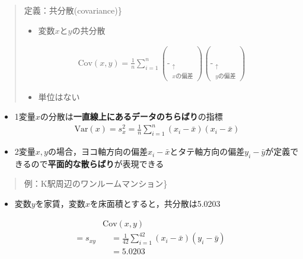 \documentclass[
]{book}
\providecommand{\tightlist}{%
  \setlength{\itemsep}{0pt}\setlength{\parskip}{0pt}}
\theoremstyle{definition}
\theoremstyle{definition}
\theoremstyle{definition}
\theoremstyle{definition}
\theoremstyle{remark}
\begin{document}
\begin{quote}
定義：共分散(covariance)\}

\begin{itemize}
\tightlist
\item
  変数\(x\)と\(y\)の共分散
\end{itemize}

\begin{align*}
\text{Cov}(x,y)
=\frac{1}{n}\sum_{i=1}^n 
(\mathop{x_i-\bar{x}}_{\substack{\uparrow \\ x\text{の偏差}}})
(\mathop{y_i-\bar{y}}_{\substack{\uparrow \\ y\text{の偏差}}})
\end{align*}

\begin{itemize}
\tightlist
\item
  単位はない
\end{itemize}
\end{quote}

\begin{itemize}
\item
  1変量\(x\)の分散は\textbf{一直線上にあるデータのちらばり}の指標
  \begin{align*} 
  \text{Var}(x)
  =s_x^2
  =\frac{1}{n}\sum_{i=1}^n (x_i-\bar{x})(x_i-\bar{x})
  \end{align*}
\item
  2変量\(x,y\)の場合，ヨコ軸方向の偏差\(x_i-\bar{x}\)とタテ軸方向の偏差\(y_i-\bar{y}\)が定義できるので\textbf{平面的な散らばり}が表現できる
\end{itemize}

\begin{quote}
例：K駅周辺のワンルームマンション\}
\end{quote}

\begin{itemize}
\tightlist
\item
  変数\(y\)を家賃，変数\(x\)を床面積とすると，共分散は5.0203
\end{itemize}

\begin{align*}
&\text{Cov}(x,y) \\
=s_{xy}
&\quad=\frac{1}{42}\sum_{i=1}^{42} (x_i-\bar{x})(y_i-\bar{y}) \\
&\quad=5.0203
\end{align*}
\end{document}
